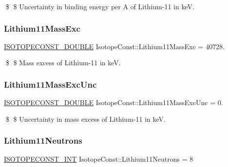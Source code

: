 \$ \$ Uncertainty in binding energy per A of Lithium-\/11 in keV. \mbox{\label{group___isotope_const-_lithium-_li11_gac8ba52def7268a5abc58ea555c64268b}} 
\subsubsection{\texorpdfstring{Lithium11\+Mass\+Exc}{Lithium11MassExc}}
{\footnotesize\ttfamily \mbox{\hyperlink{group___isotope_const-_macros_ga8f45a7272ce02c0b4c65c44636ed719a}{I\+S\+O\+T\+O\+P\+E\+C\+O\+N\+S\+T\+\_\+\+D\+O\+U\+B\+LE}} Isotope\+Const\+::\+Lithium11\+Mass\+Exc = 40728.}

\$ \$ Mass excess of Lithium-\/11 in keV. \mbox{\label{group___isotope_const-_lithium-_li11_ga6f424647e9d11db80a18f287805198c1}} 
\subsubsection{\texorpdfstring{Lithium11\+Mass\+Exc\+Unc}{Lithium11MassExcUnc}}
{\footnotesize\ttfamily \mbox{\hyperlink{group___isotope_const-_macros_ga8f45a7272ce02c0b4c65c44636ed719a}{I\+S\+O\+T\+O\+P\+E\+C\+O\+N\+S\+T\+\_\+\+D\+O\+U\+B\+LE}} Isotope\+Const\+::\+Lithium11\+Mass\+Exc\+Unc = 0.}

\$ \$ Uncertainty in mass excess of Lithium-\/11 in keV. \mbox{\label{group___isotope_const-_lithium-_li11_ga5b7445c47121b19b00190fa4225ed77f}} 
\subsubsection{\texorpdfstring{Lithium11\+Neutrons}{Lithium11Neutrons}}
{\footnotesize\ttfamily \mbox{\hyperlink{group___isotope_const-_macros_ga5f18360b3e99483a35c32d789e62621c}{I\+S\+O\+T\+O\+P\+E\+C\+O\+N\+S\+T\+\_\+\+I\+NT}} Isotope\+Const\+::\+Lithium11\+Neutrons = 8}

